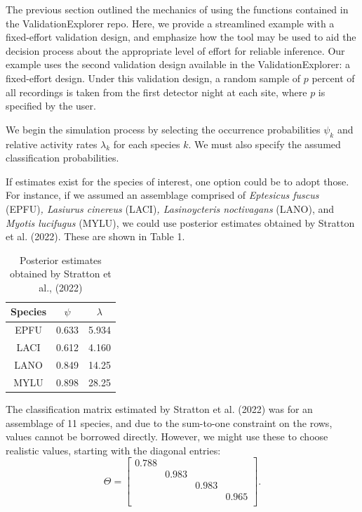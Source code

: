 \documentclass[
]{article}
\begin{document}
The previous section outlined the mechanics of using the functions contained in the ValidationExplorer repo. Here, we provide a streamlined example with a fixed-effort validation design, and emphasize how the tool may be used to aid the decision process about the appropriate level of effort for reliable inference. Our example uses the second validation design available in the ValidationExplorer: a fixed-effort design. Under this validation design, a random sample of \(p\) percent of all recordings is taken from the first detector night at each site, where \(p\) is specified by the user.

We begin the simulation process by selecting the occurrence probabilities \(\psi_k\) and relative activity rates \(\lambda_k\) for each species \(k\). We must also specify the assumed classification probabilities.

If estimates exist for the species of interest, one option could be to adopt those. For instance, if we assumed an assemblage comprised of \emph{Eptesicus fuscus} (EPFU)\emph{, Lasiurus cinereus} (LACI)\emph{, Lasinoycteris noctivagans} (LANO), and \emph{Myotis lucifugus} (MYLU), we could use posterior estimates obtained by Stratton et al. (2022). These are shown in Table 1.

\begin{table}
  \centering
  \begin{tabular} {ccc}
    \toprule 
    Species & $\psi$ & $\lambda$ \\ 
    \midrule
    EPFU    & 0.633  & 5.934 \\
    LACI    & 0.612  & 4.160 \\
    LANO    & 0.849  & 14.25 \\
    MYLU    & 0.898  & 28.25 \\
    \bottomrule
  \end{tabular}
  \caption{Posterior estimates obtained by Stratton et al., (2022)}
  \label{parVals}
\end{table}

The classification matrix estimated by Stratton et al. (2022) was for an assemblage of 11 species, and due to the sum-to-one constraint on the rows, values cannot be borrowed directly. However, we might use these to choose realistic values, starting with the diagonal entries: \[\Theta = \begin{bmatrix}
  0.788 & & &\\
   & 0.983 & &\\
   & & 0.983 & \\
   & & & 0.965 \\
\end{bmatrix}.\]
\end{document}
